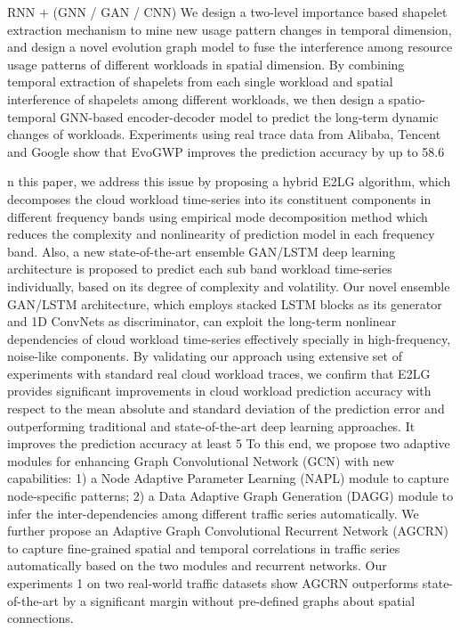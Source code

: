RNN + (GNN / GAN / CNN)
\cite{li2024evogwp}
We design a two-level importance based shapelet extraction mechanism to mine new usage pattern changes in temporal dimension, and design a novel evolution graph model to fuse the interference among resource usage patterns of different workloads in spatial dimension. By combining temporal extraction of shapelets from each single workload and spatial interference of shapelets among different workloads, we then design a spatio-temporal GNN-based encoder-decoder model to predict the long-term dynamic changes of workloads. Experiments using real trace data from Alibaba, Tencent and Google show that EvoGWP improves the prediction accuracy by up to 58.6%

\cite{RNNGAN} 
n this paper, we address this issue by proposing a hybrid E2LG algorithm, which decomposes the cloud workload time-series into its constituent components in different frequency bands using empirical mode decomposition method which reduces the complexity and nonlinearity of prediction model in each frequency band. Also, a new state-of-the-art ensemble GAN/LSTM deep learning architecture is proposed to predict each sub band workload time-series individually, based on its degree of complexity and volatility. Our novel ensemble GAN/LSTM architecture, which employs stacked LSTM blocks as its generator and 1D ConvNets as discriminator, can exploit the long-term nonlinear dependencies of cloud workload time-series effectively specially in high-frequency, noise-like components. By validating our approach using extensive set of experiments with standard real cloud workload traces, we confirm that E2LG provides significant improvements in cloud workload prediction accuracy with respect to the mean absolute and standard deviation of the prediction error and outperforming traditional and state-of-the-art deep learning approaches. It improves the prediction accuracy at least 5%
\cite{AGCRN}  %
 To
this end, we propose two adaptive modules for enhancing Graph Convolutional
Network (GCN) with new capabilities: 1) a Node Adaptive Parameter Learning
(NAPL) module to capture node-specific patterns; 2) a Data Adaptive Graph Generation (DAGG) module to infer the inter-dependencies among different traffic
series automatically. We further propose an Adaptive Graph Convolutional Recurrent Network (AGCRN) to capture fine-grained spatial and temporal correlations
in traffic series automatically based on the two modules and recurrent networks.
Our experiments 1 on two real-world traffic datasets show AGCRN outperforms
state-of-the-art by a significant margin without pre-defined graphs about spatial
connections.

